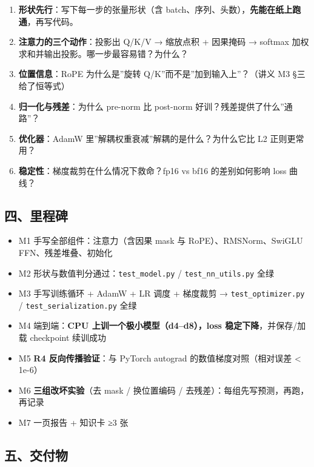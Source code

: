 \documentclass[
  chinese,
  11pt,
]{ctexart}
\providecommand{\tightlist}{%
  \setlength{\itemsep}{0pt}\setlength{\parskip}{0pt}}
\begin{document}
\begin{enumerate}
\def\labelenumi{\arabic{enumi}.}
\tightlist
\item
  \textbf{形状先行}：写下每一步的张量形状（含 batch、序列、头数），\textbf{先能在纸上跑通}，再写代码。
\item
  \textbf{注意力的三个动作}：投影出 Q/K/V → 缩放点积 + 因果掩码 → softmax 加权求和并输出投影。哪一步最容易错？为什么？
\item
  \textbf{位置信息}：RoPE 为什么是''旋转 Q/K''而不是''加到输入上''？（讲义 M3 §三给了恒等式）
\item
  \textbf{归一化与残差}：为什么 pre-norm 比 post-norm 好训？残差提供了什么''通路''？
\item
  \textbf{优化器}：AdamW 里''解耦权重衰减''解耦的是什么？为什么它比 L2 正则更常用？
\item
  \textbf{稳定性}：梯度裁剪在什么情况下救命？fp16 vs bf16 的差别如何影响 loss 曲线？
\end{enumerate}

\subsection{四、里程碑}\label{ux56dbux91ccux7a0bux7891}

\begin{itemize}
\tightlist
\item[$\square$]
  M1 手写全部组件：注意力（含因果 mask 与 RoPE）、RMSNorm、SwiGLU FFN、残差堆叠、初始化
\item[$\square$]
  M2 形状与数值判分通过：\texttt{test\_model.py} / \texttt{test\_nn\_utils.py} 全绿
\item[$\square$]
  M3 手写训练循环 + AdamW + LR 调度 + 梯度裁剪 → \texttt{test\_optimizer.py} / \texttt{test\_serialization.py} 全绿
\item[$\square$]
  M4 端到端：\textbf{CPU 上训一个极小模型（d4--d8），loss 稳定下降}，并保存/加载 checkpoint 续训成功
\item[$\square$]
  M5 \textbf{R4 反向传播验证}：与 PyTorch autograd 的数值梯度对照（相对误差 \textless{} 1e-6）
\item[$\square$]
  M6 \textbf{三组改坏实验}（去 mask / 换位置编码 / 去残差）：每组先写预测，再跑，再记录
\item[$\square$]
  M7 一页报告 + 知识卡 ≥3 张
\end{itemize}

\subsection{五、交付物}\label{ux4e94ux4ea4ux4ed8ux7269}
\end{document}
